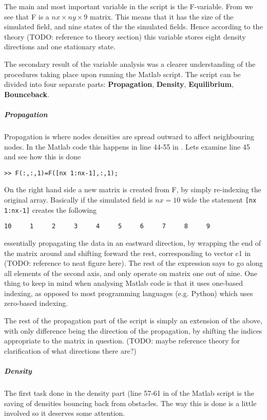 The main and most important variable in the script is the F-variable. From  we see that F is a $nx\times ny\times 9$ matrix. This means that it has the size of the simulated field, and nine states of the the simulated fields. Hence according to the theory (TODO: reference to theory section) this variable stores eight density directions and one stationary state. 

The secondary result of the variable analysis was a clearer understanding of the procedures taking place upon running the Matlab script. The script can be divided into four separate parts: \textbf{Propagation}, \textbf{Density}, \textbf{Equilibrium}, \textbf{Bounceback}.

\subparagraph{Propagation} 
Propagation is where nodes densities are spread outward to affect neighbouring nodes. In the Matlab code this happens in line 44-55 in . Lets examine line 45 and see how this is done

\begin{verbatim}
>> F(:,:,1)=F([nx 1:nx-1],:,1);
\end{verbatim}

On the right hand side a new matrix is created from F, by simply re-indexing the original array. Basically if the simulated field is $nx=10$ wide the statement \texttt{[nx 1:nx-1]} creates the following

\begin{verbatim}
10     1     2     3     4     5     6     7     8     9
\end{verbatim}

essentially propagating the data in an eastward direction, by wrapping the end of the matrix around and shifting forward the rest, corresponding to vector c1 in (TODO: reference to neat figure here). The rest of the expression says to go along all elements of the second axis, and only operate on matrix one out of nine. One thing to keep in mind when analysing Matlab code is that it uses one-based indexing, as opposed to most programming languages (e.g. Python) which uses zero-based indexing.

The rest of the propagation part of the script is simply an extension of the above, with only difference being the direction of the propagation, by shifting the indices appropriate to the matrix in question. (TODO: maybe reference theory for clarification of what directions there are?)

\subparagraph*{Density}
The first task done in the density part (line 57-61 in  of the Matlab script is the saving of densities bouncing back from obstacles. The way this is done is a little involved so it deserves some attention.


